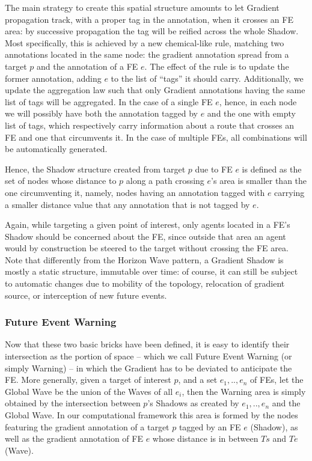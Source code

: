 \documentclass[12pt,a4paper,twoside,openright]{book}
\begin{document}
The main strategy to create this spatial structure amounts to let Gradient propagation track, with a proper tag in the annotation, when it crosses an FE area: by successive propagation the tag will be reified across the whole Shadow.
%
Most specifically, this is achieved by a new chemical-like rule, matching two annotations located in the same node: the gradient annotation spread from a target $p$ and the annotation of a FE $e$.
%
The effect of the rule is to update the former annotation, adding $e$ to the list of ``tags'' it should carry.
%
Additionally, we update the aggregation law such that only Gradient annotations having the same list of tags will be aggregated.
%
In the case of a single FE $e$, hence, in each node we will possibly have both the annotation tagged by $e$ and the one with empty list of tags, which respectively carry information about a route that crosses an FE and one that circumvents it.
%
In the case of multiple FEs, all combinations will be automatically generated.

Hence, the Shadow structure created from target $p$ due to FE $e$ is defined as the set of nodes whose distance to $p$ along a path crossing $e$'s area is smaller than the one circumventing it, namely, nodes having an annotation tagged with $e$ carrying a smaller distance value that any annotation that is not tagged by $e$.

Again, while targeting a given point of interest, only agents located in a FE's Shadow should be concerned about the FE, since outside that area an agent would by construction be steered to the target without crossing the FE area.
%
Note that differently from the Horizon Wave pattern, a Gradient Shadow is mostly a static structure, immutable over time: of course, it can still be subject to automatic changes due to mobility of the topology, relocation of gradient source, or interception of new future events.

\subsubsection{Future Event Warning}

Now that these two basic bricks have been defined, it is easy to identify their intersection as the portion of space -- which we call Future Event Warning (or simply Warning) -- in which the Gradient has to be deviated to anticipate the FE.
%
More generally, given a target of interest $p$, and a set $e_1,..,e_n$ of FEs, let the Global Wave be the union of the Waves of all $e_i$, then the Warning area is simply obtained by the intersection between $p$'s Shadows as created by $e_1,..,e_n$ and the Global Wave.
%
In our computational framework this area is formed by the nodes featuring the gradient annotation of a target $p$ tagged by an FE $e$ (Shadow), as well as the gradient annotation of FE $e$ whose distance is in between $Ts$ and $Te$ (Wave).
\end{document}
